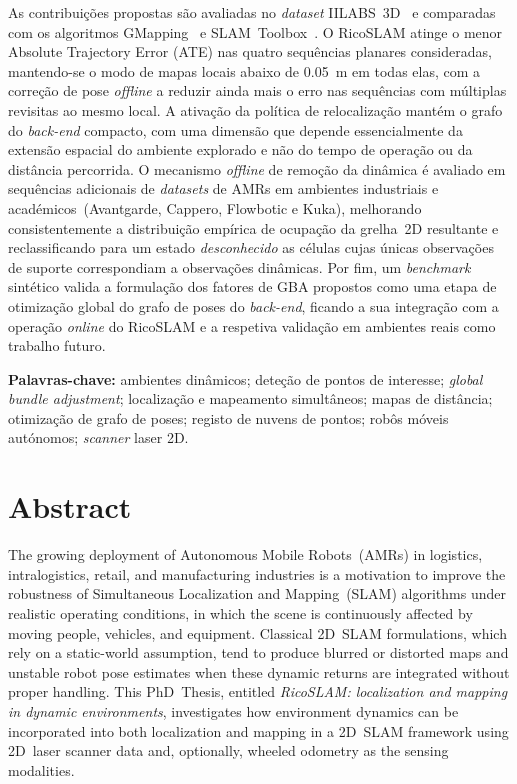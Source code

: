 As contribuições propostas são avaliadas no \emph{dataset}
IILABS~3D~\cite{ribeiro:access:2025} e comparadas com os algoritmos
GMapping~\cite{grisetti:tro:2007} e
SLAM~Toolbox~\cite{macenski-jambrecic:joss:2021}. O RicoSLAM atinge o
menor Absolute Trajectory Error (ATE) nas quatro sequências planares
consideradas, mantendo-se o modo de mapas locais abaixo de
\SI{0.05}{\metre} em todas elas, com a correção de pose \emph{offline} a
reduzir ainda mais o erro nas sequências com múltiplas revisitas ao mesmo
local.
A ativação da política de relocalização mantém o grafo do
\emph{back-end} compacto, com uma dimensão que depende essencialmente da
extensão espacial do ambiente explorado e não do tempo de operação ou
da distância percorrida. O mecanismo \emph{offline} de remoção da
dinâmica é avaliado em sequências adicionais de \emph{datasets} de AMRs em
ambientes industriais e académicos~(Avantgarde, Cappero, Flowbotic e Kuka),
melhorando consistentemente a distribuição empírica de ocupação da grelha~2D
resultante e reclassificando para um estado \emph{desconhecido} as
células cujas únicas observações de suporte correspondiam a observações dinâmicas.
Por fim, um \emph{benchmark} sintético valida a formulação dos fatores de GBA
propostos como uma etapa de otimização global do grafo de poses do
\emph{back-end}, ficando a sua integração com a operação \emph{online} do
RicoSLAM e a respetiva validação em ambientes reais como trabalho futuro.

\hfill

\textbf{Palavras-chave:}
ambientes dinâmicos;
deteção de pontos de interesse;
\emph{global bundle adjustment};
localização e mapeamento simultâneos;
mapas de distância;
otimização de grafo de poses;
registo de nuvens de pontos;
robôs móveis autónomos;
\emph{scanner} laser 2D.

\cleardoublepage

\chapter*{Abstract}

The growing deployment of Autonomous Mobile Robots~(AMRs) in logistics,
intralogistics, retail,
and manufacturing industries is a motivation to improve the robustness of
Simultaneous Localization and Mapping~(SLAM) algorithms under realistic
operating conditions, in which the scene is continuously affected by
moving people, vehicles, and equipment. Classical 2D~SLAM formulations,
which rely on a static-world assumption, tend to produce blurred or
distorted maps and unstable robot pose estimates when these dynamic
returns are integrated without proper handling. This PhD~Thesis,
entitled
\textit{RicoSLAM: localization and mapping in dynamic environments},
investigates how environment dynamics can be incorporated into both
localization and mapping in a 2D~SLAM framework using 2D~laser scanner data
and, optionally, wheeled odometry as the sensing modalities.

